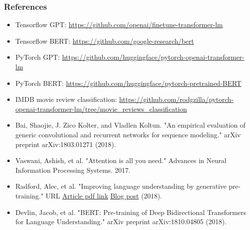 \documentclass[9pt]{beamer}
\begin{document}
\begin{frame}
  \frametitle{References}

  \fontsize{6pt}{7.2}\selectfont

  \begin{itemize}
  \item Tensorflow GPT: \href{https://github.com/openai/finetune-transformer-lm}{https://github.com/openai/finetune-transformer-lm}

  \item Tensorflow BERT: \href{https://github.com/google-research/bert}{https://github.com/google-research/bert}

  \item PyTorch GPT: \href{https://github.com/huggingface/pytorch-openai-transformer-lm}{https://github.com/huggingface/pytorch-openai-transformer-lm}

  \item PyTorch BERT: \href{https://github.com/huggingface/pytorch-pretrained-BERT}{https://github.com/huggingface/pytorch-pretrained-BERT}

  \item IMDB movie review classification: \href{https://github.com/rodgzilla/pytorch-openai-transformer-lm/tree/movie_reviews_classification}{https://github.com/rodgzilla/pytorch-openai-transformer-lm/tree/movie\_reviews\_classification}

  \item Bai, Shaojie, J. Zico Kolter, and Vladlen Koltun. "An
    empirical evaluation of generic convolutional and recurrent
    networks for sequence modeling." arXiv preprint arXiv:1803.01271
    (2018).

  \item Vaswani, Ashish, et al. "Attention is all you need." Advances
    in Neural Information Processing Systems. 2017.

  \item Radford, Alec, et al. "Improving language understanding by generative pre-training." URL
    \href{https://s3-us-west-2.amazonaws.com/openai-assets/research-covers/language-unsupervised/language_understanding_paper.pdf}{Article pdf link}
    \href{https://blog.openai.com/language-unsupervised/}{Blog post} (2018).

  \item Devlin, Jacob, et al. "BERT: Pre-training of Deep
    Bidirectional Transformers for Language Understanding." arXiv
    preprint arXiv:1810.04805 (2018).
  \end{itemize}
\end{frame}
\end{document}
